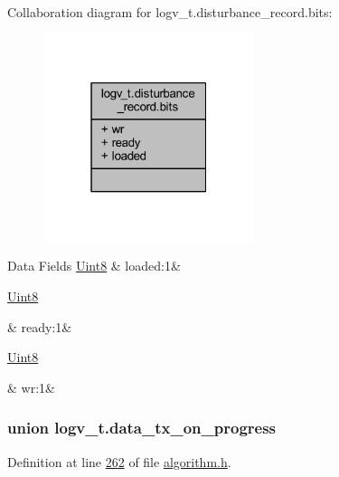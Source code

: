 Collaboration diagram for logv\+\_\+t.\+disturbance\+\_\+record.\+bits\+:\nopagebreak
\begin{figure}[H]
\begin{center}
\leavevmode
\includegraphics[width=175pt]{dd/d94/a00888}
\end{center}
\end{figure}
\begin{DoxyFields}{Data Fields}
\hypertarget{a00021_a2430fe39e225818bd957ed4cb53eb770}{\hyperlink{a00072_af84840501dec18061d18a68c162a8fa2}{Uint8}}\label{a00021_a2430fe39e225818bd957ed4cb53eb770}
&
loaded\+:1&
\\
\hline

\hypertarget{a00021_ab2fdab230a2c39f3595a947861863cb7}{\hyperlink{a00072_af84840501dec18061d18a68c162a8fa2}{Uint8}}\label{a00021_ab2fdab230a2c39f3595a947861863cb7}
&
ready\+:1&
\\
\hline

\hypertarget{a00021_af3151d23f9c88ea74e0229bcdd321cde}{\hyperlink{a00072_af84840501dec18061d18a68c162a8fa2}{Uint8}}\label{a00021_af3151d23f9c88ea74e0229bcdd321cde}
&
wr\+:1&
\\
\hline

\end{DoxyFields}
\label{d7/db1/a00590}
\hypertarget{a00021_d7/db1/a00590}{}
\subsubsection{union logv\+\_\+t.\+data\+\_\+tx\+\_\+on\+\_\+progress}


Definition at line \hyperlink{a00021_source_l00262}{262} of file \hyperlink{a00021_source}{algorithm.\+h}.



